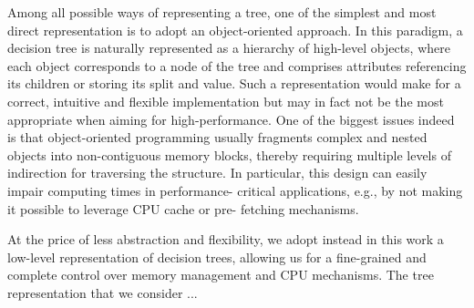 Among all possible ways of representing a tree, one of the simplest and most
direct representation is to adopt an object-oriented approach. In this
paradigm, a decision tree is naturally represented as a hierarchy of high-level
objects, where each object corresponds to a node of the tree and comprises
attributes referencing its children or storing its split and value. Such a
representation would make for a correct, intuitive and flexible implementation
but may in fact not be the most appropriate when aiming for high-performance.
One of the biggest issues indeed is that object-oriented programming usually
fragments complex and nested objects into non-contiguous memory blocks, thereby
requiring multiple levels of indirection for traversing the structure. In
particular, this design can easily impair computing times in performance-
critical applications, e.g., by not making it possible to leverage CPU cache or
pre- fetching mechanisms.

At the price of less abstraction and flexibility, we adopt instead in this work
a low-level representation of decision trees, allowing us for a fine-grained
and complete control over memory management and CPU mechanisms. The tree
representation that we consider ...


